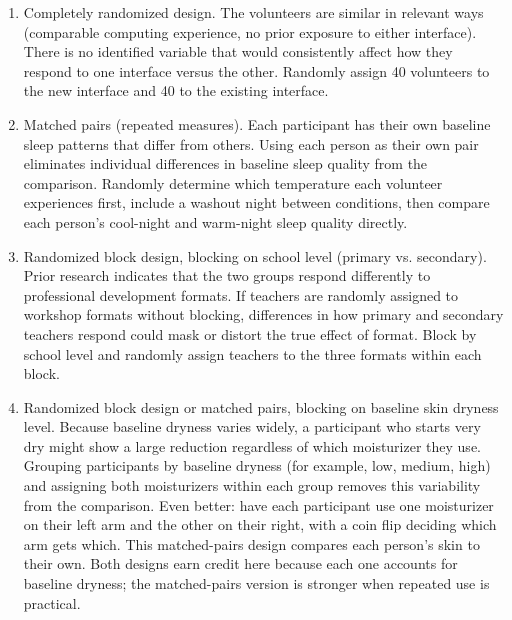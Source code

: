 \begin{Answer}[ref={ex:design-choice}]
\begin{enumerate} 
    \item Completely randomized design. The volunteers are similar in relevant ways (comparable computing experience, no prior exposure to either interface). There is no identified variable that would consistently affect how they respond to one interface versus the other. Randomly assign 40 volunteers to the new interface and 40 to the existing interface.

    \item Matched pairs (repeated measures). Each participant has their own baseline sleep patterns that differ from others. Using each person as their own pair eliminates individual differences in baseline sleep quality from the comparison. Randomly determine which temperature each volunteer experiences first, include a washout night between conditions, then compare each person's cool-night and warm-night sleep quality directly.

    \item Randomized block design, blocking on school level (primary vs. secondary). Prior research indicates that the two groups respond differently to professional development formats. If teachers are randomly assigned to workshop formats without blocking, differences in how primary and secondary teachers respond could mask or distort the true effect of format. Block by school level and randomly assign teachers to the three formats within each block.

    \item Randomized block design or matched pairs, blocking on baseline skin dryness level. Because baseline dryness varies widely, a participant who starts very dry might show a large reduction regardless of which moisturizer they use. Grouping participants by baseline dryness (for example, low, medium, high) and assigning both moisturizers within each group removes this variability from the comparison. Even better: have each participant use one moisturizer on their left arm and the other on their right, with a coin flip deciding which arm gets which. This matched-pairs design compares each person's skin to their own. Both designs earn credit here because each one accounts for baseline dryness; the matched-pairs version is stronger when repeated use is practical.
\end{enumerate}
\end{Answer}

